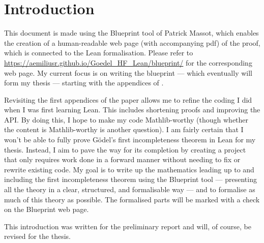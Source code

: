 \section{Introduction}
This document is made using the Blueprint tool of Patrick Massot, which enables the creation of a 
human-readable web page (with accompanying pdf) of the proof, which is connected to the Lean formalisation.
Please refer to \url{https://aemiliusr.github.io/Goedel_HF_Lean/blueprint/} for the corresponding web page.
My current focus is on writing the blueprint — which eventually will form my thesis — starting with
the appendices of \cite{swierczkowski2003finite}.

Revisiting the first appendices of the paper allows me to refine the coding I did when I was first learning Lean. 
This includes shortening proofs and improving the API. 
By doing this, I hope to make my code Mathlib-worthy (though whether the content is Mathlib-worthy is another question). 
I am fairly certain that I won't be able to fully prove Gödel's first incompleteness theorem in Lean for my thesis. 
Instead, I aim to pave the way for its completion by creating a project that only requires
work done in a forward manner without needing to fix or rewrite existing code.
My goal is to write up the mathematics leading up to and including the first incompleteness theorem using the Blueprint tool — 
presenting all the theory in a clear, structured, and formalisable way — and to formalise as much of this theory as possible. 
The formalised parts will be marked with a check on the Blueprint web page.

This introduction was written for the preliminary report and will, of course, be revised for the thesis.
